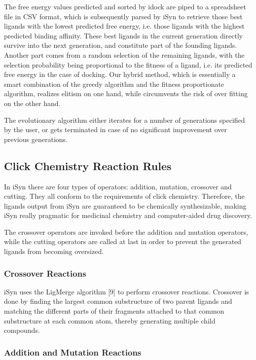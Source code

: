 The free energy values predicted and sorted by idock are piped to a spreadsheet file in CSV format, which is subsequently parsed by iSyn to retrieve those best ligands with the lowest predicted free energy, i.e. those ligands with the highest predicted binding affinity. These best ligands in the current generation directly survive into the next generation, and constitute part of the founding ligands. Another part comes from a random selection of the remaining ligands, with the selection probability being proportional to the fitness of a ligand, i.e. its predicted free energy in the case of docking. Our hybrid method, which is essentially a smart combination of the greedy algorithm and the fitness proportionate algorithm, realizes elitism on one hand, while circumvents the risk of over fitting on the other hand.

The evolutionary algorithm either iterates for a number of generations specified by the user, or gets terminated in case of no significant improvement over previous generations.

\subsection{Click Chemistry Reaction Rules}

In iSyn there are four types of operators: addition, mutation, crossover and cutting. They all conform to the requirements of click chemistry. Therefore, the ligands output from iSyn are guaranteed to be chemically synthesizable, making iSyn really pragmatic for medicinal chemistry and computer-aided drug discovery.

The crossover operators are invoked before the addition and mutation operators, while the cutting operators are called at last in order to prevent the generated ligands from becoming oversized.

\subsubsection{Crossover Reactions}

iSyn uses the LigMerge algorithm [9] to perform crossover reactions. Crossover is done by finding the largest common substructure of two parent ligands and matching the different parts of their fragments attached to that common substructure at each common atom, thereby generating multiple child compounds.

\subsubsection{Addition and Mutation Reactions}


